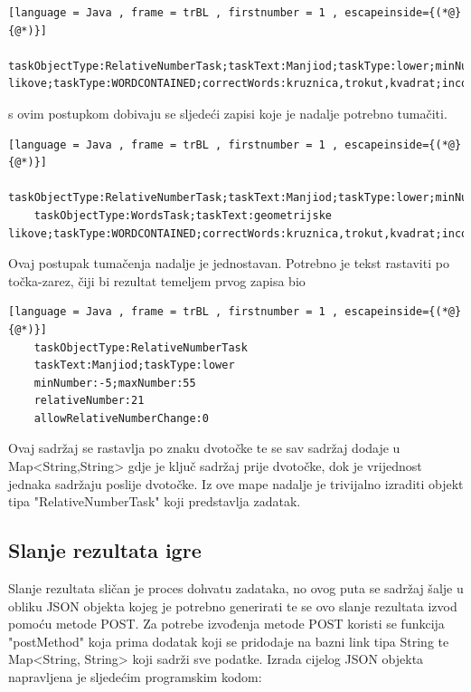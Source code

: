 \documentclass[times, utf8, zavrsni, numeric]{fer}
\begin{document}
	
	\begin{lstlisting}[language = Java , frame = trBL , firstnumber = 1 , escapeinside={(*@}{@*)}]
	taskObjectType:RelativeNumberTask;taskText:Manjiod;taskType:lower;minNumber:-5;maxNumber:55;relativeNumber:21;allowRelativeNumberChange:0#DELIMITER#taskObjectType:WordsTask;taskText:geometrijske likove;taskType:WORDCONTAINED;correctWords:kruznica,trokut,kvadrat;incorrectWords:piramida,valjak,sfera
	\end{lstlisting}
	s ovim postupkom dobivaju se sljedeći zapisi koje je nadalje potrebno tumačiti.
	\begin{lstlisting}[language = Java , frame = trBL , firstnumber = 1 , escapeinside={(*@}{@*)}]
	taskObjectType:RelativeNumberTask;taskText:Manjiod;taskType:lower;minNumber:-5;maxNumber:55;relativeNumber:21;allowRelativeNumberChange:0
	taskObjectType:WordsTask;taskText:geometrijske likove;taskType:WORDCONTAINED;correctWords:kruznica,trokut,kvadrat;incorrectWords:piramida,valjak,sfera
	\end{lstlisting}
	Ovaj postupak tumačenja nadalje je jednostavan. Potrebno je tekst rastaviti po točka-zarez, čiji bi rezultat temeljem prvog zapisa bio
	\begin{lstlisting}[language = Java , frame = trBL , firstnumber = 1 , escapeinside={(*@}{@*)}]
	taskObjectType:RelativeNumberTask
	taskText:Manjiod;taskType:lower
	minNumber:-5;maxNumber:55
	relativeNumber:21
	allowRelativeNumberChange:0
	\end{lstlisting}
	Ovaj sadržaj se rastavlja po znaku dvotočke te se sav sadržaj dodaje u Map<String,String> gdje je ključ sadržaj prije dvotočke, dok je vrijednost jednaka sadržaju poslije dvotočke.
	Iz ove mape nadalje je trivijalno izraditi objekt tipa "RelativeNumberTask" koji predstavlja zadatak. 


	\subsection{Slanje rezultata igre}
	Slanje rezultata sličan je proces dohvatu zadataka, no ovog puta se sadržaj šalje u obliku JSON objekta kojeg je potrebno generirati te se ovo slanje rezultata izvod pomoću metode POST\cite{post}. 
	Za potrebe izvođenja metode POST koristi se funkcija "postMethod" koja prima dodatak koji se pridodaje na bazni link tipa String te Map<String, String> koji sadrži sve podatke. 
	Izrada cijelog JSON objekta napravljena je sljedećim programskim kodom:
	
\end{document}
